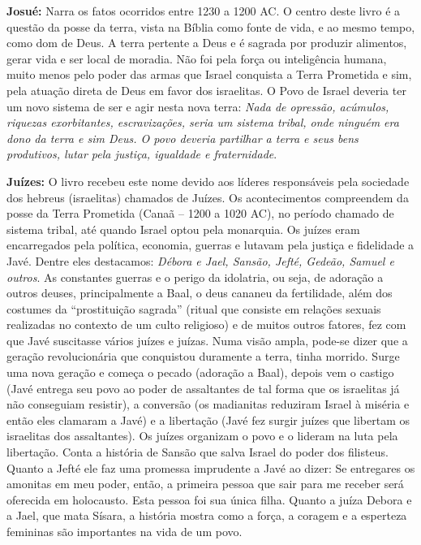 \documentclass[
]{book}
\begin{document}
\textbf{Josué:} Narra os fatos ocorridos entre 1230 a 1200 AC. O centro deste livro é a questão da posse da terra, vista na Bíblia como fonte de vida, e ao mesmo tempo, como dom de Deus. A terra pertente a Deus e é sagrada por produzir alimentos, gerar vida e ser local de moradia. Não foi pela força ou inteligência humana, muito menos pelo poder das armas que Israel conquista a Terra Prometida e sim, pela atuação direta de Deus em favor dos israelitas. O Povo de Israel deveria ter um novo sistema de ser e agir nesta nova terra: \emph{Nada de opressão, acúmulos, riquezas exorbitantes, escravizações, seria um sistema tribal, onde ninguém era dono da terra e sim Deus. O povo deveria partilhar a terra e seus bens produtivos, lutar pela justiça, igualdade e fraternidade}.

\textbf{Juízes:} O livro recebeu este nome devido aos líderes responsáveis pela sociedade dos hebreus (israelitas) chamados de Juízes. Os acontecimentos compreendem da posse da Terra Prometida (Canaã -- 1200 a 1020 AC), no período chamado de sistema tribal, até quando Israel optou pela monarquia. Os juízes eram encarregados pela política, economia, guerras e lutavam pela justiça e fidelidade a Javé. Dentre eles destacamos: \emph{Débora e Jael, Sansão, Jefté, Gedeão, Samuel e outros}. As constantes guerras e o perigo da idolatria, ou seja, de adoração a outros deuses, principalmente a Baal, o deus cananeu da fertilidade, além dos costumes da ``prostituição sagrada'' (ritual que consiste em relações sexuais realizadas no contexto de um culto religioso) e de muitos outros fatores, fez com que Javé suscitasse vários juízes e juízas. Numa visão ampla, pode-se dizer que a geração revolucionária que conquistou duramente a terra, tinha morrido. Surge uma nova geração e começa o pecado (adoração a Baal), depois vem o castigo (Javé entrega seu povo ao poder de assaltantes de tal forma que os israelitas já não conseguiam resistir), a conversão (os madianitas reduziram Israel à miséria e então eles clamaram a Javé) e a libertação (Javé fez surgir juízes que libertam os israelitas dos assaltantes). Os juízes organizam o povo e o lideram na luta pela libertação. Conta a história de Sansão que salva Israel do poder dos filisteus. Quanto a Jefté ele faz uma promessa imprudente a Javé ao dizer: Se entregares os amonitas em meu poder, então, a primeira pessoa que sair para me receber será oferecida em holocausto. Esta pessoa foi sua única filha. Quanto a juíza Debora e a Jael, que mata Sísara, a história mostra como a força, a coragem e a esperteza femininas são importantes na vida de um povo.
\end{document}
